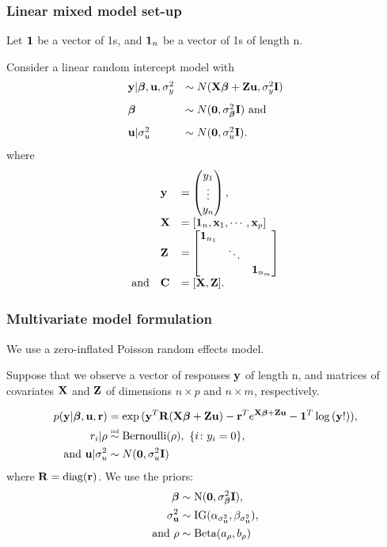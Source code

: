 \documentclass{beamer}
\begin{document}
\begin{frame}
\frametitle{Linear mixed model set-up}
Let ${\bf 1}$ be a vector of 1s, and ${\bf 1}_n$ be a vector of 1s of
length n.

Consider a linear random intercept model with
$$
\begin{array}{ll}
{\bf y}|{\boldsymbol \beta},{\bf u},\sigma_y^2 &\sim N({\bf X} {\boldsymbol \beta} + {\bf Z} {\bf u}, \sigma_y^2 {\bf I}) \\[2ex]
{\boldsymbol\beta} &\sim N({\bf 0}, \sigma_{\boldsymbol \beta}^2 {\bf I}) \text{ and} \\[2ex]
{\bf u}|\sigma_u^2 &\sim N({\bf 0}, \sigma_u^2 {\bf I}).
\end{array}
$$
\noindent where
$$
\begin{array}{rll}
& {\bf y} & =
\begin{pmatrix}
y_1 \\
\vdots \\
y_n
\end{pmatrix}, \\[2ex]
& {\bf X} &= [{\bf 1}_n, {\bf x}_1, \cdots, {\bf x}_p] \\
& {\bf Z} &=
\begin{bmatrix}
{\bf1}_{n_1} &  & \\
& \ddots & \\
& & {\bf 1}_{n_m}
\end{bmatrix} \\
 \text{and}& {\bf C} &= [{\bf X}, {\bf Z}].
\end{array}
$$
\end{frame}



\begin{frame}
\frametitle{Multivariate model formulation}
We use a zero-inflated Poisson random effects model.

\medskip

Suppose that we observe a vector of responses ${\bf y}$ of length n, and matrices
of covariates ${\bf X}$ and ${\bf Z}$ of dimensions $n \times p$ and $n \times m$,
respectively.

\begin{align*}
p({\bf y}|{\boldsymbol \beta}, {\bf u}, {\bf r}) &= \exp{({\bf y}^T{\bf R}({\bf X}{\boldsymbol\beta}+ {\bf Z}{\bf u}) - {\bf r}^Te^{{\bf X}{\boldsymbol\beta}+ {\bf Z}{\bf u}} - {\bf1}^T\log{({\bf y}!)})}, \\
r_i|\rho & \stackrel{\mbox{\tiny iid}}{\sim} \text{Bernoulli}(\rho), \ \{i \colon y_i=0\}, \\
\text{and }{\bf u}|\sigma_u^2 &\sim N({\bf 0}, \sigma_u^2 {\bf I}) \\
\end{align*}
\noindent where ${\bf R} =\mbox{diag}({\bf r})$.
We use the priors:
\begin{align*}
{\boldsymbol\beta} &\sim \text{N}({\bf 0}, \sigma_{\boldsymbol \beta}^2{\bf I}), \\
\sigma_{\bf u}^2 &\sim \text{IG}(\alpha_{\sigma_{\bf u}^2}, \beta_{\sigma_{\bf u}^2}), \\
\text{and }\rho &\sim \text{Beta}(a_\rho, b_\rho) \\
\end{align*}
\end{frame}
\end{document}
